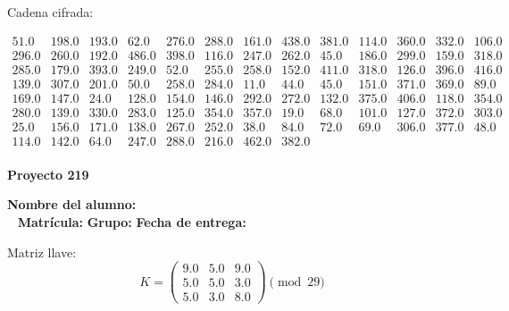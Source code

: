 \documentclass[12pt]{article}
\begin{document}
Cadena cifrada:
\begin{center}
$\begin{array}{lllllllllllll}
51.0 & 198.0 & 193.0 & 62.0 & 276.0 & 288.0 & 161.0 & 438.0 & 381.0 & 114.0 & 360.0 & 332.0 & 106.0\\
296.0 & 260.0 & 192.0 & 486.0 & 398.0 & 116.0 & 247.0 & 262.0 & 45.0 & 186.0 & 299.0 & 159.0 & 318.0\\
285.0 & 179.0 & 393.0 & 249.0 & 52.0 & 255.0 & 258.0 & 152.0 & 411.0 & 318.0 & 126.0 & 396.0 & 416.0\\
139.0 & 307.0 & 201.0 & 50.0 & 258.0 & 284.0 & 11.0 & 44.0 & 45.0 & 151.0 & 371.0 & 369.0 & 89.0\\
169.0 & 147.0 & 24.0 & 128.0 & 154.0 & 146.0 & 292.0 & 272.0 & 132.0 & 375.0 & 406.0 & 118.0 & 354.0\\
280.0 & 139.0 & 330.0 & 283.0 & 125.0 & 354.0 & 357.0 & 19.0 & 68.0 & 101.0 & 127.0 & 372.0 & 303.0\\
25.0 & 156.0 & 171.0 & 138.0 & 267.0 & 252.0 & 38.0 & 84.0 & 72.0 & 69.0 & 306.0 & 377.0 & 48.0\\
114.0 & 142.0 & 64.0 & 247.0 & 288.0 & 216.0 & 462.0 & 382.0\\
\end{array}$
\end{center}

\newpage


\textbf{Proyecto 219}

\textbf{Nombre del alumno:} \underline{\hspace{13cm}}\\\
\vspace{1cm}
\textbf{Matrícula:} \underline{\hspace{4cm}} \hspace{1cm}
\textbf{Grupo:} \underline{\hspace{2cm}}
\textbf{Fecha de entrega:} \underline{\hspace{2cm}}

\medskip

Matriz llave:
\[
K = \begin{pmatrix}
9.0 & 5.0 & 9.0\\
5.0 & 5.0 & 3.0\\
5.0 & 3.0 & 8.0
\end{pmatrix} \pmod{29}
\]
\end{document}
